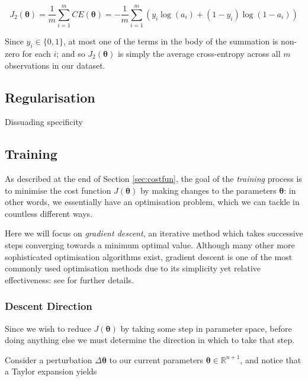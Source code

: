 \documentclass{article}[11pt]
\begin{document}
        $$
        J_2(\boldsymbol{\theta}) = \frac{1}{m} \sum_{i=1}^{m} CE(\boldsymbol{\theta}) = - \frac{1}{m} \sum_{i=1}^{m} \left( y_i \log(a_i) + (1 - y_i) \log(1 - a_i) \right)
        $$
        
        Since $y_i \in \{0, 1\}$, at most one of the terms in the body of the summation is non-zero for each $i$; and so $J_2(\boldsymbol{\theta})$ is simply the average cross-entropy across all $m$ observations in our dataset.
    
    
    
    \subsection{Regularisation}
        
        
        Dissuading specificity
        
        
    \subsection{Training} \label{sec:gradient_descent}
        
        As described at the end of Section \ref{sec:costfun}, the goal of the \textit{training} process is to minimise the cost function $J(\boldsymbol{\theta})$ by making changes to the parameters $\boldsymbol{\theta}$: in other words, we essentially have an optimisation problem, which we can tackle in countless different ways.
        
        Here we will focus on \textit{gradient descent}, an iterative method which takes successive steps converging towards a minimum optimal value. Although many other more sophisticated optimisation algorithms exist, gradient descent is one of the most commonly used optimisation methods due to its simplicity yet relative effectiveness: see \cite{lecun_backprop} for further details.
        
        
        \subsubsection{Descent Direction}
            
            Since we wish to reduce $J(\boldsymbol{\theta})$ by taking some step in parameter space, before doing anything else we must determine the direction in which to take that step.
            
            Consider a perturbation $\Delta \boldsymbol{\theta}$ to our current parameters $\boldsymbol{\theta} \in \mathbb{R}^{n+1}$, and notice that a Taylor expansion yields
            
\end{document}
